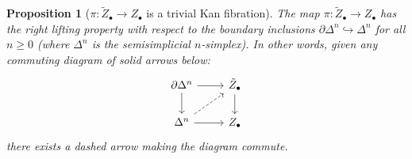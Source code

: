 \documentclass[12pt]{article}
\newtheorem{proposition}[theorem]{Proposition}
\theoremstyle{definition}
\theoremstyle{remark}
\numberwithin{equation}{subsection}
\begin{document}
\begin{proposition}[$\pi:\tilde Z_\bullet\to Z_\bullet$ is a trivial Kan fibration]\label{trivialKanfibration}
The map $\pi:\tilde Z_\bullet\to Z_\bullet$ has the right lifting property with respect to the boundary inclusions $\partial\Delta^n\hookrightarrow\Delta^n$ for all $n\geq 0$ (where $\Delta^n$ is the semisimplicial $n$-simplex).  In other words, given any commuting diagram of solid arrows below:
\begin{equation}
\begin{tikzcd}
\partial\Delta^n\arrow{r}\arrow{d}&\tilde Z_\bullet\arrow{d}\\
\Delta^n\arrow{r}\arrow[dashrightarrow]{ur}&Z_\bullet
\end{tikzcd}
\end{equation}
there exists a dashed arrow making the diagram commute.
\end{proposition}
\end{document}
